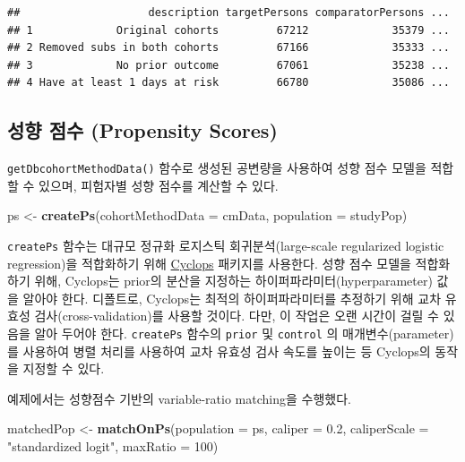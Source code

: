 \documentclass[11pt]{book}
\newenvironment{Shaded}{\begin{snugshade}}{\end{snugshade}}
\newcommand{\KeywordTok}[1]{\textcolor[rgb]{0.13,0.29,0.53}{\textbf{#1}}}
\newcommand{\DataTypeTok}[1]{\textcolor[rgb]{0.13,0.29,0.53}{#1}}
\newcommand{\DecValTok}[1]{\textcolor[rgb]{0.00,0.00,0.81}{#1}}
\newcommand{\FloatTok}[1]{\textcolor[rgb]{0.00,0.00,0.81}{#1}}
\newcommand{\StringTok}[1]{\textcolor[rgb]{0.31,0.60,0.02}{#1}}
\newcommand{\NormalTok}[1]{#1}
\theoremstyle{definition}
\theoremstyle{definition}
\theoremstyle{definition}
\theoremstyle{remark}
\begin{document}
\begin{verbatim}
##                    description targetPersons comparatorPersons ...
## 1             Original cohorts         67212             35379 ...
## 2 Removed subs in both cohorts         67166             35333 ...
## 3             No prior outcome         67061             35238 ...
## 4 Have at least 1 days at risk         66780             35086 ...
\end{verbatim}

\subsection{성향 점수 (Propensity Scores)}\label{--propensity-scores}

\texttt{getDbcohortMethodData()} 함수로 생성된 공변량을 사용하여 성향
점수 모델을 적합할 수 있으며, 피험자별 성향 점수를 계산할 수 있다.

\begin{Shaded}
\begin{Highlighting}[]
\NormalTok{ps <-}\StringTok{ }\KeywordTok{createPs}\NormalTok{(}\DataTypeTok{cohortMethodData =}\NormalTok{ cmData, }\DataTypeTok{population =}\NormalTok{ studyPop)}
\end{Highlighting}
\end{Shaded}

\texttt{createPs} 함수는 대규모 정규화 로지스틱 회귀분석(large-scale
regularized logistic regression)을 적합화하기 위해
\href{https://ohdsi.github.io/Cyclops/}{Cyclops} 패키지를 사용한다. 성향
점수 모델을 적합화하기 위해, Cyclops는 prior의 분산을 지정하는
하이퍼파라미터(hyperparameter) 값을 알아야 한다. 디폴트로, Cyclops는
최적의 하이퍼파라미터를 추정하기 위해 교차 유효성
검사(cross-validation)를 사용할 것이다. 다만, 이 작업은 오랜 시간이 걸릴
수 있음을 알아 두어야 한다. \texttt{createPs} 함수의 \texttt{prior} 및
\texttt{control} 의 매개변수(parameter)를 사용하여 병렬 처리를 사용하여
교차 유효성 검사 속도를 높이는 등 Cyclops의 동작을 지정할 수 있다.

예제에서는 성향점수 기반의 variable-ratio matching을 수행했다.

\begin{Shaded}
\begin{Highlighting}[]
\NormalTok{matchedPop <-}\StringTok{ }\KeywordTok{matchOnPs}\NormalTok{(}\DataTypeTok{population =}\NormalTok{ ps, }\DataTypeTok{caliper =} \FloatTok{0.2}\NormalTok{,}
                        \DataTypeTok{caliperScale =} \StringTok{"standardized logit"}\NormalTok{, }\DataTypeTok{maxRatio =} \DecValTok{100}\NormalTok{)}
\end{Highlighting}
\end{Shaded}
\end{document}
